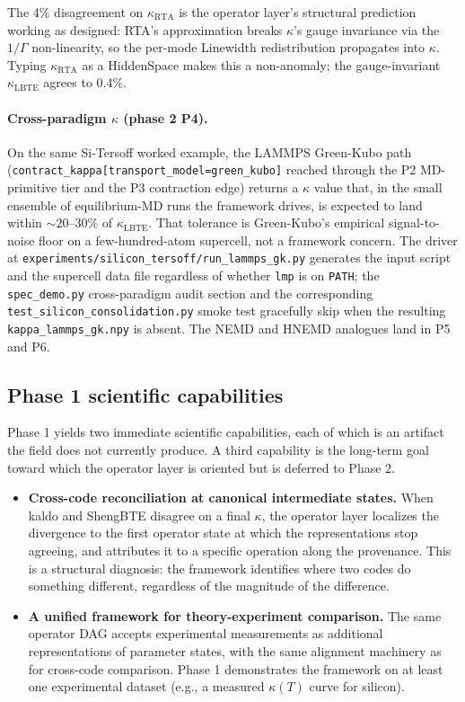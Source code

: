 \documentclass[11pt,a4paper]{article}
\begin{document}
The 4\% disagreement on $\kappa_\text{RTA}$ is the operator layer's structural prediction
working as designed: RTA's approximation breaks $\kappa$'s gauge invariance via the
$1/\Gamma$ non-linearity, so the per-mode Linewidth redistribution propagates into
$\kappa$. Typing $\kappa_\text{RTA}$ as a HiddenSpace makes this a non-anomaly; the
gauge-invariant $\kappa_\text{LBTE}$ agrees to 0.4\%.

\paragraph{Cross-paradigm $\kappa$ (phase 2 P4).} On the same Si-Tersoff
worked example, the LAMMPS Green-Kubo path
(\texttt{contract\_kappa[transport\_model=green\_kubo]} reached through the
P2 MD-primitive tier and the P3 contraction edge) returns a $\kappa$ value
that, in the small ensemble of equilibrium-MD runs the framework drives,
is expected to land within $\sim 20$--$30\%$ of $\kappa_\text{LBTE}$. That tolerance is
Green-Kubo's empirical signal-to-noise floor on a few-hundred-atom
supercell, not a framework concern. The driver at
\texttt{experiments/silicon\_tersoff/run\_lammps\_gk.py} generates the input
script and the supercell data file regardless of whether \texttt{lmp} is on
\texttt{PATH}; the \texttt{spec\_demo.py} cross-paradigm audit section and
the corresponding \texttt{test\_silicon\_consolidation.py} smoke test
gracefully skip when the resulting \texttt{kappa\_lammps\_gk.npy} is
absent. The NEMD and HNEMD analogues land in P5 and P6.

\subsection{Phase 1 scientific capabilities}

Phase 1 yields two immediate scientific capabilities, each of which is an artifact the field does
not currently produce. A third capability is the long-term goal toward which the operator layer is
oriented but is deferred to Phase 2.

\begin{itemize}[leftmargin=2em]
  \item \textbf{Cross-code reconciliation at canonical intermediate states.} When kaldo and
        ShengBTE disagree on a final $\kappa$, the operator layer localizes the divergence to the
        first operator state at which the representations stop agreeing, and attributes it to a
        specific operation along the provenance. This is a structural diagnosis: the framework
        identifies where two codes do something different, regardless of the magnitude of the
        difference.
  \item \textbf{A unified framework for theory-experiment comparison.} The same operator DAG
        accepts experimental measurements as additional representations of parameter states,
        with the same alignment machinery as for cross-code comparison. Phase 1 demonstrates the
        framework on at least one experimental dataset (e.g., a measured $\kappa(T)$ curve for
        silicon).
\end{itemize}
\end{document}
